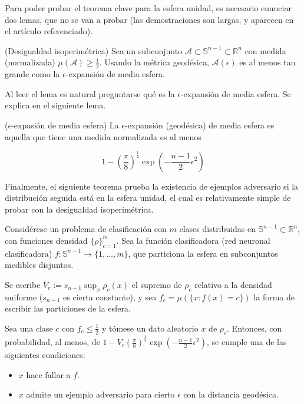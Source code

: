 Para poder probar el teorema clave para la esfera unidad, es necesario enunciar dos lemas, que no se van a probar (las demostraciones son largas, y aparecen en el artículo referenciado).

\begin{lema}(Desigualdad isoperimétrica) \label{lem29}
Sea un subconjunto $\mathcal{A} \subset \mathbb{S}^{n-1} \subset \mathbb{R}^n$ con medida (normalizada) $\mu(\mathcal{A}) \geq \frac{1}{2}$. Usando la métrica geodésica, $\mathcal{A}(\epsilon)$ es al menos tan grande como la $\epsilon$-expansión de media esfera.
\end{lema}

Al leer el lema es natural preguntarse qué es la $\epsilon$-expansión de media esfera. Se explica en el siguiente lema.

\begin{lema}($\epsilon$-expasión de media esfera)
La $\epsilon$-expansión (geodésica) de media esfera es aquella que tiene una medida normalizada es al menos

$$1 - \left( \frac{\pi}{8}\right)^{\frac{1}{2}}\exp\left( -\frac{n-1}{2} \epsilon^2 \right)$$
\end{lema}

Finalmente, el siguiente teorema prueba la existencia de ejemplos adversario si la distribución seguida está en la esfera unidad, el cual es relativamente simple de probar con la desigualdad isoperimétrica.

\begin{teorema}
Considérese un problema de clasificación con $m$ clases distribuidas en $\mathbb{S}^{n-1} \subset \mathbb{R}^n$, con funciones densidad $\{\rho\}_{c=1}^m$. Sea la función clasificadora (red neuronal clasificadora) $f: \mathbb{S}^{n-1} \to \{1,\ldots,m\}$, que particiona la esfera en subconjuntos medibles disjuntos. 

Se escribe $V_c := s_{n-1} \sup_x \rho_c(x)$ el supremo de $\rho_c$ relativo a la densidad uniforme ($s_{n-1}$ es cierta constante), y sea $f_c = \mu(\{x:f(x)=c\})$ la forma de escribir las particiones de la esfera.

Sea una clase $c$ con $f_c \leq \frac{1}{2}$ y tómese un dato aleatorio $x$ de $\rho_c$. Entonces, con probabilidad, al menos, de $1 - V_c \left( \frac{\pi}{8} \right)^{\frac{1}{2}} \exp\left( -\frac{n-1}{2} \epsilon^2 \right)$, se cumple una de las siguientes condiciones:

\begin{itemize}
	\item $x$ hace fallar a $f$.
	\item $x$ admite un ejemplo adversario para cierto $\epsilon$ con la distancia geodésica.
\end{itemize}
\end{teorema}

